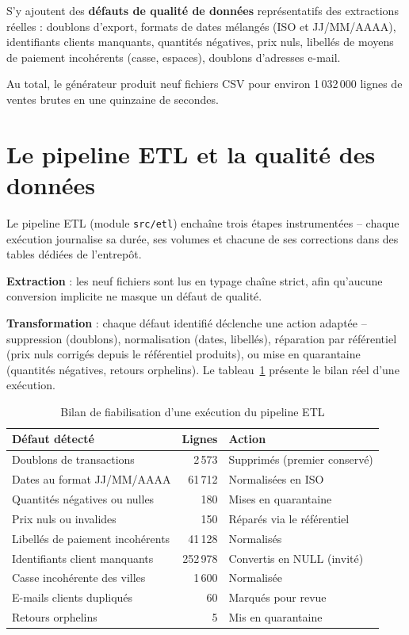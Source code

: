 \documentclass[12pt,a4paper]{report}
\begin{document}
S'y ajoutent des \textbf{défauts de qualité de données} représentatifs des
extractions réelles : doublons d'export, formats de dates mélangés (ISO et
JJ/MM/AAAA), identifiants clients manquants, quantités négatives, prix nuls,
libellés de moyens de paiement incohérents (casse, espaces), doublons
d'adresses e-mail.

Au total, le générateur produit neuf fichiers CSV pour environ
1\,032\,000 lignes de ventes brutes %
en une quinzaine de secondes.

\section{Le pipeline ETL et la qualité des données}

Le pipeline ETL (module \texttt{src/etl}) enchaîne trois étapes instrumentées
-- chaque exécution journalise sa durée, ses volumes et chacune de ses
corrections dans des tables dédiées de l'entrepôt.

\textbf{Extraction} : les neuf fichiers sont lus en typage
\og chaîne \fg{} strict, afin qu'aucune conversion implicite ne masque un
défaut de qualité.

\textbf{Transformation} : chaque défaut identifié déclenche une action
adaptée -- suppression (doublons), normalisation (dates, libellés),
réparation par référentiel (prix nuls corrigés depuis le référentiel
produits), ou mise en quarantaine (quantités négatives, retours orphelins).
Le tableau~\ref{tab:dq} présente le bilan réel d'une exécution.

\begin{table}[htbp]
  \centering
  \small
  \begin{tabular}{@{}lrl@{}}
    \toprule
    \textbf{Défaut détecté} & \textbf{Lignes} & \textbf{Action} \\
    \midrule
    Doublons de transactions        & 2\,573  & Supprimés (premier conservé) \\
    Dates au format JJ/MM/AAAA      & 61\,712 & Normalisées en ISO \\
    Quantités négatives ou nulles   & 180     & Mises en quarantaine \\
    Prix nuls ou invalides          & 150     & Réparés via le référentiel \\
    Libellés de paiement incohérents & 41\,128 & Normalisés \\
    Identifiants client manquants   & 252\,978 & Convertis en NULL (invité) \\
    Casse incohérente des villes    & 1\,600  & Normalisée \\
    E-mails clients dupliqués       & 60      & Marqués pour revue \\
    Retours orphelins               & 5       & Mis en quarantaine \\
    \bottomrule
  \end{tabular}
  \caption{Bilan de fiabilisation d'une exécution du pipeline ETL}
  \label{tab:dq}
\end{table}
\end{document}
